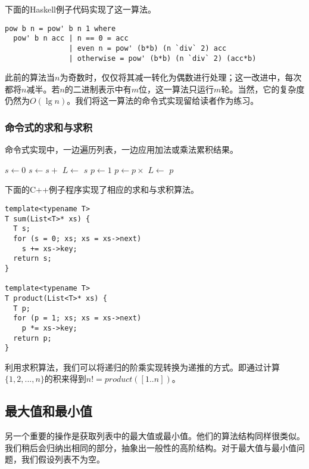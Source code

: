 \documentclass[UTF8]{article}
\begin{document}
下面的Haskell例子代码实现了这一算法。

\lstset{language=Haskell}
\begin{lstlisting}
pow b n = pow' b n 1 where
  pow' b n acc | n == 0 = acc
               | even n = pow' (b*b) (n `div` 2) acc
               | otherwise = pow' (b*b) (n `div` 2) (acc*b)
\end{lstlisting}

此前的算法当$n$为奇数时，仅仅将其减一转化为偶数进行处理；这一改进中，每次都将$n$减半。若$n$的二进制表示中有$m$位，这一算法只运行$m$轮。当然，它的复杂度仍然为$O(\lg n)$。我们将这一算法的命令式实现留给读者作为练习。

\subsubsection{命令式的求和与求积}
命令式实现中，一边遍历列表，一边应用加法或乘法累积结果。

\begin{algorithmic}[1]
  \State $s \gets 0$
    \State $s \gets s +$ 
    \State $L \gets$ 
  \EndWhile
  \State \Return $s$
\EndFunction
\Statex
{}
  \State $p \gets 1$
    \State $p \gets p \times $ 
    \State $L \gets$ 
  \EndWhile
  \State \Return $p$
\EndFunction
\end{algorithmic}

下面的C++例子程序实现了相应的求和与求积算法。

\lstset{language=C++}
\begin{lstlisting}
template<typename T>
T sum(List<T>* xs) {
  T s;
  for (s = 0; xs; xs = xs->next)
    s += xs->key;
  return s;
}

template<typename T>
T product(List<T>* xs) {
  T p;
  for (p = 1; xs; xs = xs->next)
    p *= xs->key;
  return p;
}
\end{lstlisting}

利用求积算法，我们可以将递归的阶乘实现转换为递推的方式。即通过计算$\{1, 2, ..., n\}$的积来得到$n! = product([1..n])$。

\subsection{最大值和最小值}

另一个重要的操作是获取列表中的最大值或最小值。他们的算法结构同样很类似。我们稍后会归纳出相同的部分，抽象出一般性的高阶结构。对于最大值与最小值问题，我们假设列表不为空。
\end{document}
